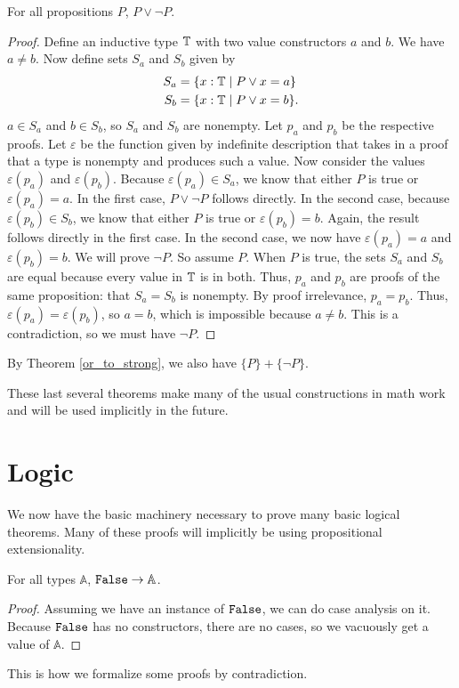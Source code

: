 \documentclass[../../math.tex]{subfiles}
\begin{document}
\begin{theorem}
    For all propositions $P$, $P \vee \neg P$.
\end{theorem}
\begin{proof}
    Define an inductive type $\mathbb{T}$ with two value constructors $a$ and $b$.  We
    have $a \neq b$.  Now define sets $S_a$ and $S_b$ given by
    \begin{align*}
        S_a &= \{x : \mathbb{T} \mid P \vee x = a\} \\
        S_b &= \{x : \mathbb{T} \mid P \vee x = b\}.
    \end{align*}
    $a \in S_a$ and $b \in S_b$, so $S_a$ and $S_b$ are nonempty.  Let $p_a$ and
    $p_b$ be the respective proofs.  Let $\varepsilon$ be the function given by
    indefinite description that takes in a proof that a type is nonempty and
    produces such a value.  Now consider the values $\varepsilon(p_a)$ and
    $\varepsilon(p_b)$.  Because $\varepsilon(p_a) \in S_a$, we know that either
    $P$ is true or $\varepsilon(p_a) = a$.  In the first case, $P \vee \neg P$
    follows directly.  In the second case, because $\varepsilon(p_b) \in S_b$,
    we know that either $P$ is true or $\varepsilon(p_b) = b$.  Again, the
    result follows directly in the first case.  In the second case, we now have
    $\varepsilon(p_a) = a$ and $\varepsilon(p_b) = b$.  We will prove $\neg P$.
    So assume $P$.  When $P$ is true, the sets $S_a$ and $S_b$ are equal because
    every value in $\mathbb{T}$ is in both.  Thus, $p_a$ and $p_b$ are proofs of the
    same proposition: that $S_a = S_b$ is nonempty.  By proof irrelevance, $p_a
    = p_b$.  Thus, $\varepsilon(p_a) = \varepsilon(p_b)$, so $a = b$, which is
    impossible because $a \neq b$.  This is a contradiction, so we must have
    $\neg P$.
\end{proof}
\noindent By Theorem \ref{or_to_strong}, we also have $\{P\} + \{\neg P\}$.

These last several theorems make many of the usual constructions in math work
and will be used implicitly in the future.

\section{Logic}

We now have the basic machinery necessary to prove many basic logical theorems.
Many of these proofs will implicitly be using propositional extensionality.

\begin{theorem} \label{false_rect}
    For all types $\mathbb A$, $\verb|False| \rightarrow \mathbb A$.
\end{theorem}
\begin{proof}
    Assuming we have an instance of $\verb|False|$, we can do case analysis on
    it.  Because $\verb|False|$ has no constructors, there are no cases, so we
    vacuously get a value of $\mathbb A$.
\end{proof}
\noindent This is how we formalize some proofs by contradiction.
\end{document}
